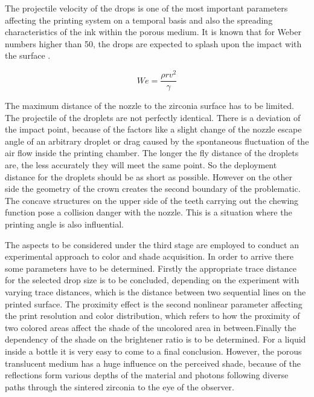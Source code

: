  The projectile velocity of the drops is one of the most important parameters affecting the printing system on a temporal basis and also the spreading characteristics of the ink within the porous medium. It is known that for Weber numbers higher than 50, the drops are expected to splash upon the impact with the surface \citep{clarke2002spreading}.
 
 \bigskip
 
 \begin{equation}\label{eq:weber}
 We=\frac{\rho rv^2}{\gamma}
 \end{equation}
 
 \bigskip
 
 The maximum distance of the nozzle to the zirconia surface has to be limited. The projectile of the droplets are not perfectly identical. There is a deviation of the impact point, because of the factors like a slight change of the nozzle escape angle of an arbitrary droplet or drag caused by the spontaneous fluctuation of the air flow inside the printing chamber. The longer the fly distance of the droplets are, the less accurately they will meet the same point. So the deployment distance for the droplets should be as short as possible. However on the other side the geometry of the crown creates the second boundary of the problematic. The concave structures on the upper side of the teeth carrying out the chewing function pose a collision danger with the nozzle. This is a situation where the printing angle is also influential. 
 
 The aspects to be considered under the third stage are employed to conduct an experimental approach to color and shade acquisition. In order to arrive there some parameters have to be determined. Firstly the appropriate trace distance for the selected drop size is to be concluded, depending on the experiment with varying trace distances, which is the distance between two sequential lines on the printed surface. The proximity effect is the second nonlinear parameter affecting the print resolution and color distribution, which refers to how the proximity of two colored areas affect the shade of the uncolored area in between.Finally the dependency of the shade on the brightener ratio is to be determined. For a liquid inside a bottle it is very easy to come to a final conclusion. However, the porous translucent medium has a huge influence on the perceived shade, because of the  reflections form various depths of the material and photons following diverse paths through the sintered zirconia to the eye of the observer.
 
